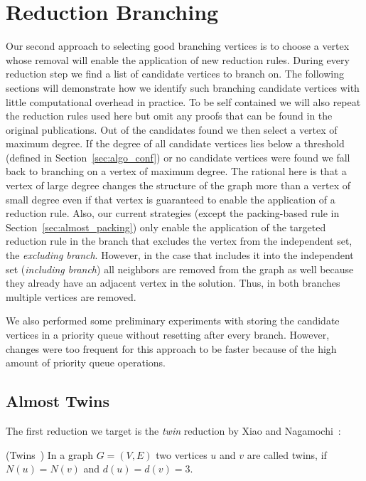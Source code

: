 \documentclass[a4paper,UKenglish,cleveref, autoref, thm-restate]{lipics-v2021}
\begin{document}
\section{Reduction Branching}\label{sec:reduction_branching}
Our second approach to selecting good branching vertices is to choose a vertex
whose removal will enable the application of new reduction rules. During every
reduction step we find a list of candidate vertices to branch on. The following
sections will demonstrate how we identify such branching candidate vertices with little
computational overhead in practice. To be self contained we will also repeat the reduction
rules used here but omit any proofs that can be found in the original
publications. Out of the candidates found we then select a vertex of
maximum degree. If the degree of all candidate vertices lies below a threshold
(defined in Section~\ref{sec:algo_conf}) or no candidate vertices were found we fall back to branching on a vertex
of maximum degree. The rational here is that a vertex of large degree changes
the structure of the graph more than a vertex of small degree even if that
vertex is guaranteed to enable the application of a reduction rule. Also, our
current strategies (except the packing-based rule in Section~\ref{sec:almost_packing}) only enable the application of the targeted reduction rule in
the branch that excludes the vertex from the independent set, the
\emph{excluding branch}. However, in the
case that includes it into the independent set (\emph{including branch}) all neighbors are removed from
the graph as well because they already have an adjacent vertex in the solution.
Thus, in both branches multiple vertices are removed.

We also performed some preliminary experiments with storing the candidate vertices in
a priority queue without resetting after every branch.
However, changes were too frequent for this approach to be faster because of
the high amount of priority queue operations.

\subsection{Almost Twins}

The first reduction we target is the \emph{twin} reduction by Xiao and Nagamochi~\cite{XiaoUnconfined}:

\begin{definition}(Twins~\cite{XiaoUnconfined})
  In a graph $G=(V,E)$ two vertices $u$ and $v$ are called twins, if $N(u) = N(v)$ and $d(u) = d(v) = 3$.
\end{definition}
\end{document}
